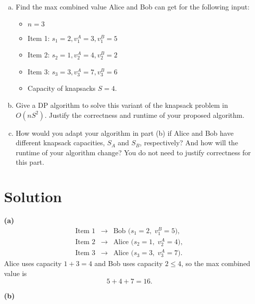 \documentclass[11pt]{article}
\begin{document}
\begin{tcolorbox}[title={Problem 1 (Knapsack, Take II, 50 pts)}]
        \begin{enumerate}[(a)]
            \item Find the max combined value Alice and Bob can get for the following input:
            \begin{itemize}
                \item \( n = 3 \)
                \item Item 1: \( s_1 = 2, v_1^A = 3, v_1^B = 5 \)
                \item Item 2: \( s_2 = 1, v_2^A = 4, v_2^B = 2 \)
                \item Item 3: \( s_3 = 3, v_3^A = 7, v_3^B = 6 \)
                \item Capacity of knapsacks \(S = 4\).
            \end{itemize} 
            \item Give a DP algorithm to solve this variant of the knapsack problem in $O(nS^2)$. Justify the correctness and runtime of your proposed algorithm. 
            \item How would you adapt your algorithm in part (b) if Alice and Bob have different knapsack capacities, \(S_A\) and \(S_B\), respectively? And how will the runtime of your algorithm change? You do not need to justify correctness for this part.
        \end{enumerate}
    \end{tcolorbox}
    \section*{Solution}
    \textbf{(a)}
    \[
    \begin{array}{rcl}
    \text{Item 1} &\to& \text{Bob (} s_1=2,\; v_1^B=5\text{)},\\[1mm]
    \text{Item 2} &\to& \text{Alice (} s_2=1,\; v_2^A=4\text{)},\\[1mm]
    \text{Item 3} &\to& \text{Alice (} s_3=3,\; v_3^A=7\text{)}.
    \end{array}
    \]
    Alice uses capacity \(1+3=4\) and Bob uses capacity \(2\le 4\), so the max combined value is 
    \[
    5+4+7=\boxed{16}.
    \]
    
    \medskip
    
    \textbf{(b)}
    
\end{document}
